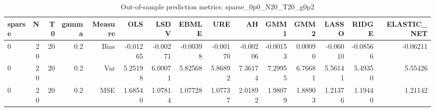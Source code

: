 \begin{table}[!htbp]\centering
\caption{Out-of-sample prediction metrics: sparse_0p0_N20_T20_g0p2}
\label{tab:table3_sparse_0p0_N20_T20_g0p2}
\begin{tabular}{lrrrrrrrrrrrrrr}
\hline
sparse & N & T0 & gamma & Measure & OLS & LSDV & EBMLE & URE & AH & GMM1 & GMM2 & LASSO & RIDGE & ELASTIC_NET \\
\hline
0 & 20 & 20 & 0.2 & Bias & -0.01265 & -0.00271 & -0.00398 & -0.00170 & -0.00206 & -0.00153 & 0.00090 & -0.06010 & -0.08566 & -0.06211 \\
0 & 20 & 20 & 0.2 & Var & 5.25198 & 6.00071 & 5.82568 & 5.86892 & 7.36174 & 7.29955 & 6.76681 & 5.56141 & 5.49350 & 5.55426 \\
0 & 20 & 20 & 0.2 & MSE & 1.68540 & 1.07814 & 1.07728 & 1.07737 & 2.01892 & 1.98079 & 1.88903 & 1.21376 & 1.19440 & 1.21142 \\
\hline
\end{tabular}
\end{table}

